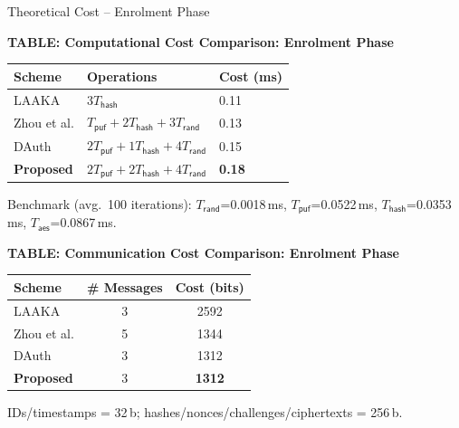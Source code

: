 \begin{frame}{Theoretical Cost -- Enrolment Phase}
    \scriptsize
    \begin{center}
        \textbf{TABLE: Computational Cost Comparison: Enrolment Phase}
    \end{center}
    \vspace{-0.15cm}
    \begin{center}
        \renewcommand{\arraystretch}{1.15}
        \setlength{\tabcolsep}{4pt}
        \begin{tabular}{lll}
            \toprule
            Scheme & Operations & Cost (ms) \\
            \midrule
            LAAKA      & $3T_\mathsf{hash}$ & 0.11 \\
            Zhou et al. & $T_\mathsf{puf}+2T_\mathsf{hash}+3T_\mathsf{rand}$ & 0.13 \\
            DAuth      & $2T_\mathsf{puf}+1T_\mathsf{hash}+4T_\mathsf{rand}$ & 0.15 \\
            \textbf{Proposed} & $2T_\mathsf{puf}+2T_\mathsf{hash}+4T_\mathsf{rand}$ & \textbf{0.18} \\
            \bottomrule
        \end{tabular}
    \end{center}
    \vspace{-0.05cm}
    \begin{center}
        {\tiny Benchmark (avg.\ 100 iterations): $T_\mathsf{rand}$=0.0018\,ms, $T_\mathsf{puf}$=0.0522\,ms,
        $T_\mathsf{hash}$=0.0353\,ms, $T_\mathsf{aes}$=0.0867\,ms.}
    \end{center}

    \vspace{0.15cm}
    \begin{center}
        \textbf{TABLE: Communication Cost Comparison: Enrolment Phase}
    \end{center}
    \vspace{-0.15cm}
    \begin{center}
        \renewcommand{\arraystretch}{1.15}
        \setlength{\tabcolsep}{6pt}
        \begin{tabular}{lcc}
            \toprule
            Scheme & \# Messages & Cost (bits) \\
            \midrule
            LAAKA      & 3 & 2592 \\
            Zhou et al. & 5 & 1344 \\
            DAuth      & 3 & 1312 \\
            \textbf{Proposed} & 3 & \textbf{1312} \\
            \bottomrule
        \end{tabular}
    \end{center}
    \vspace{-0.05cm}
    \begin{center}
        {\tiny IDs/timestamps = 32\,b; hashes/nonces/challenges/ciphertexts = 256\,b.}
    \end{center}
\end{frame}

